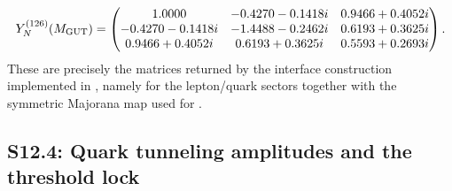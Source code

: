 \documentclass[11pt]{article}
\begin{document}
\begin{equation}
 Y_N^{(126)}(M_{\rm GUT})=
 \begin{pmatrix}
  1.0000 & -0.4270-0.1418i & 0.9466+0.4052i \\
  -0.4270-0.1418i & -1.4488-0.2462i & 0.6193+0.3625i \\
  0.9466+0.4052i & 0.6193+0.3625i & 0.5593+0.2693i
 \end{pmatrix}.
\end{equation}
\endgroup
These are precisely the matrices returned by the interface construction implemented in , namely  for the lepton/quark sectors together with the symmetric Majorana map used for .

\subsection*{S12.4: Quark tunneling amplitudes and the threshold lock}
\end{document}
